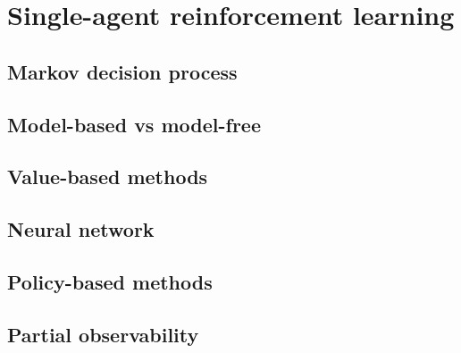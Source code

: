 \section{Single-agent reinforcement learning} 
\label{sec:ch2_single_agent_RL}
\subsection{Markov decision process} \label{sec:ch2_mdp}
\subsection{Model-based vs model-free} \label{sec:ch2_model_based_vs_model_free}
\subsection{Value-based methods} \label{sec:ch2_value_based_methods}
\subsection{Neural network} \label{sec:ch2_neural_network}
\subsection{Policy-based methods} \label{sec:ch2_policy_based_methods}
\subsection{Partial observability} \label{sec:ch2_partial_observability}